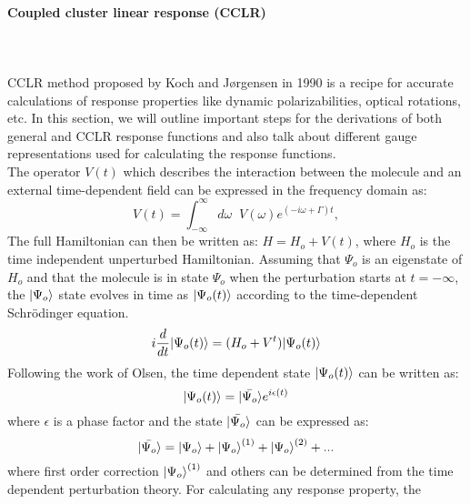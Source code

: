 \paragraph{Coupled cluster linear response (CCLR)}~\\\\
CCLR method proposed by Koch and J{\o}rgensen in 1990\cite{Koch90} is a recipe for accurate
calculations of response properties like dynamic polarizabilities, optical
rotations, etc. In this section, we will outline important steps for the
derivations of both general and CCLR response functions and also talk about
different gauge representations used for calculating the response functions.\\
The operator $V(t)$ which describes the interaction between the molecule and 
an external time-dependent field can be expressed in the frequency domain as: 
\begin{equation}
V(t) = \int_{-\infty}^{\infty}d\omega\;\;V(\omega) e^{(-i\omega + \Gamma)t} ,
\end{equation}
The full Hamiltonian can then be written as: $H = H_o + V(t)$, where $H_o$ is the
time independent unperturbed Hamiltonian. Assuming that $\Psi_o$ is an eigenstate of $H_o$
and that the molecule is in state $\Psi_o$ when the perturbation starts at $t = -\infty$, 
the $| \Psi_o \rangle$ state evolves in time as $| \Psi_o(t) \rangle$ according to the time-dependent 
Schr\"odinger equation.
\begin{equation}
i\frac{d}{dt}| \Psi_o(t) \rangle = (H_o + V^t)| \Psi_o(t) \rangle
\end{equation}
Following the work of Olsen\cite{Olsen85}, the time dependent state $| \Psi_o(t) \rangle$
can be written as:
\begin{equation}
| \Psi_o(t) \rangle = | \bar{\Psi_o} \rangle e^{i\epsilon(t)}
\end{equation}
where $\epsilon$ is a phase factor and the state $| \bar{\Psi_o} \rangle$ can be expressed as\cite{Koch90}:
\begin{equation}
| \bar{\Psi_o} \rangle = | \Psi_o \rangle + {| \Psi_o \rangle}^{(1)}+ {| \Psi_o \rangle}^{(2)} + ...
\end{equation}
where first order correction ${| \Psi_o \rangle}^{(1)}$ and others can be determined 
from the time dependent perturbation theory. For calculating any response property, the
